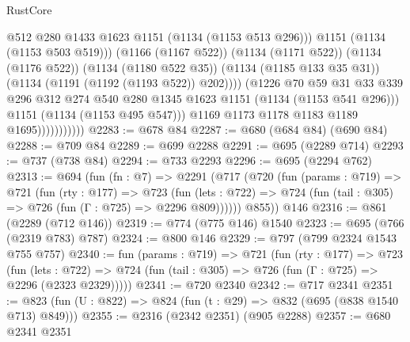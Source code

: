 \begin{lexlean}{RustCore}
\begin{coremodule}
                                    @512
                                    @280
                                    @1433
                                    @1623
                                    @1151
                                    (@1134 (@1153 @513 @296)))
                                  @1151
                                  (@1134 (@1153 @503 @519)))
                                (@1166 (@1167 @522))
                                (@1134 (@1171 @522))
                                (@1134 (@1176 @522))
                                (@1134 (@1180 @522 @35))
                                (@1134 (@1185 @133 @35 @31))
                                (@1134 (@1191 (@1192 (@1193 @522)) @202))))
                            (@1226
                              @70
                              @59
                              @31
                              @33
                              @339
                              @296
                              @312
                              @274
                              @540
                              @280
                              @1345
                              @1623
                              @1151
                              (@1134 (@1153 @541 @296)))
                            @1151
                            (@1134 (@1153 @495 @547)))
                          @1169
                          @1173
                          @1178
                          @1183
                          @1189
                          @1695)))))))))))
@2283 := @678 @84
@2287 := @680 (@684 @84) (@690 @84)
@2288 := @709 @84
@2289 := @699 @2288
@2291 := @695 (@2289 @714)
@2293 := @737 (@738 @84)
@2294 := @733 @2293
@2296 := @695 (@2294 @762)
@2313 := @694
    (fun (fn : @7) =>
    @2291
      (@717
        (@720
          (fun (params : @719) =>
          @721
            (fun (rty : @177) =>
            @723
              (fun (lets : @722) =>
              @724 (fun (tail : @305) => @726 (fun (Γ : @725) => @2296 @809))))))
        @855))
    @146
@2316 := @861 (@2289 (@712 @146))
@2319 := @774 (@775 @146) @1540
@2323 := @695 (@766 (@2319 @783) @787)
@2324 := @800 @146
@2329 := @797 (@799 @2324 @1543 @755 @757)
@2340 := fun (params : @719) =>
  @721
    (fun (rty : @177) =>
    @723
      (fun (lets : @722) =>
      @724 (fun (tail : @305) => @726 (fun (Γ : @725) => @2296 (@2323 @2329)))))
@2341 := @720 @2340
@2342 := @717 @2341
@2351 := @823 (fun (U : @822) => @824 (fun (t : @29) => @832 (@695 (@838 @1540 @713) @849)))
@2355 := @2316 (@2342 @2351) (@905 @2288)
@2357 := @680 @2341 @2351

\end{coremodule}
\end{lexlean}
